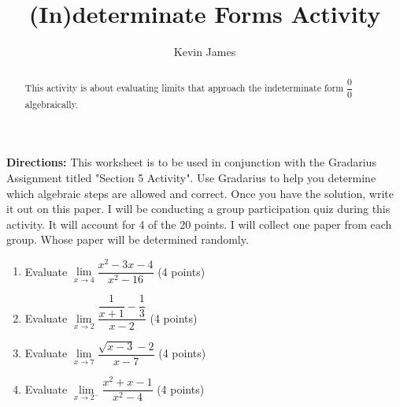\documentclass[handout,nooutcomes,noauthor]{Ximera}
\author{Kevin James}
\title{(In)determinate Forms Activity}
\begin{document}
	\begin{abstract}
		This activity is about evaluating limits that approach the indeterminate form $ \dfrac{0}{0} $ algebraically.
	\end{abstract}
	\maketitle
	\textbf{Directions:}  This worksheet is to be used in conjunction with the Gradarius Assignment titled "Section 5 Activity".  Use Gradarius to help you determine which algebraic steps are allowed and correct.  Once you have the solution, write it out on this paper.  I will be conducting a group participation quiz during this activity.  It will account for 4 of the 20 points.  I will collect one paper from each group.  Whose paper will be determined randomly.
	
	\begin{enumerate}[label=\arabic*]
		\item Evaluate $ \lim\limits_{x \to 4}\dfrac{x^2-3x-4}{x^2-16} $ (4 points)
		\item Evaluate $ \lim\limits_{x \to 2}\dfrac{\dfrac{1}{x+1}-\dfrac{1}{3}}{x-2} $ (4 points)
		
		\clearpage
		
		\item Evaluate $ \lim\limits_{x \to 7}\dfrac{\sqrt{x-3}-2}{x-7} $ (4 points)
		\item Evaluate $ \lim\limits_{x \to 2^-}\dfrac{x^2+x-1}{x^2-4} $ (4 points)
	\end{enumerate}
\end{document}
